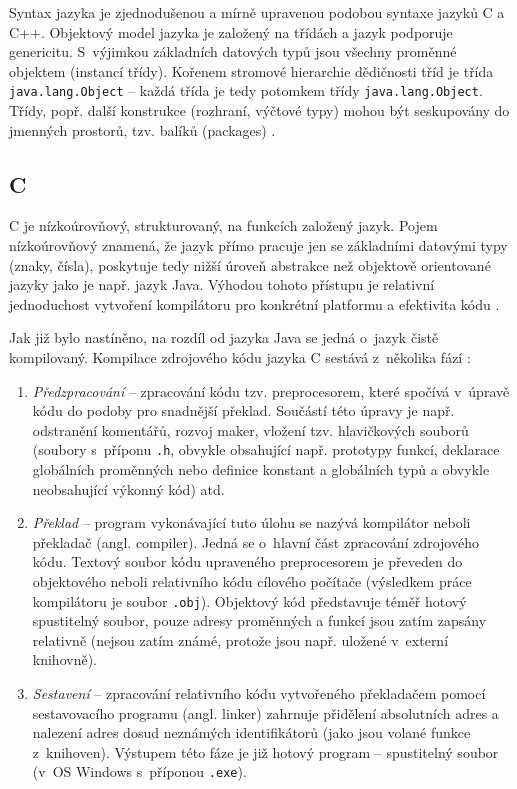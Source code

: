 \documentclass[czech,BP]{thesiskiv}
\begin{document}
Syntax jazyka je zjednodušenou a mírně upravenou podobou syntaxe jazyků C a C++. Objektový model jazyka je založený na třídách a jazyk podporuje genericitu. S~výjimkou základních datových typů jsou všechny proměnné objektem (instancí třídy). Kořenem stromové hierarchie dědičnosti tříd je třída \texttt{java.lang.Object} – každá třída je tedy potomkem třídy \texttt{java.lang.Object}. Třídy, popř. další konstrukce (rozhraní, výčtové typy) mohou být seskupovány do jmenných prostorů, tzv. balíků (packages) \cite{java-book, java-guide-object}.\par

\subsection{C}
C je nízkoúrovňový, strukturovaný, na funkcích založený jazyk. Pojem nízkoúrovňový znamená, že jazyk přímo pracuje jen se základními datovými typy (znaky, čísla), poskytuje tedy nižší úroveň abstrakce než objektově orientované jazyky jako je např. jazyk Java. Výhodou tohoto přístupu je relativní jednoduchost vytvoření kompilátoru pro konkrétní platformu a efektivita kódu \cite{c-book, c-guide}.\par
Jak již bylo nastíněno, na rozdíl od jazyka Java se jedná o~jazyk čistě kompilovaný. Kompilace zdrojového kódu jazyka C sestává z~několika fází \cite{c-book, c-guide}:
\begin{enumerate}
\item \textit{Předzpracování} -- zpracování kódu tzv. preprocesorem, které spočívá v~úpravě kódu do podoby pro snadnější překlad. Součástí této úpravy je např. odstranění komentářů, rozvoj maker, vložení tzv. hlavičkových souborů (soubory s~příponu \texttt{.h}, obvykle obsahující např. prototypy funkcí, deklarace globálních proměnných nebo definice konstant a globálních typů a obvykle neobsahující výkonný kód) atd.
\item \textit{Překlad} -- program vykonávající tuto úlohu se nazývá kompilátor neboli překladač (angl. compiler). Jedná se o~hlavní část zpracování zdrojového kódu. Textový soubor kódu upraveného preprocesorem je převeden do objektového neboli relativního kódu cílového počítače (výsledkem práce kompilátoru je soubor \texttt{.obj}). Objektový kód představuje téměř hotový spustitelný soubor, pouze adresy proměnných a funkcí jsou zatím zapsány relativně (nejsou zatím známé, protože jsou např. uložené v~externí knihovně).
\item \textit{Sestavení} -- zpracování relativního kódu vytvořeného překladačem pomocí sestavovacího programu (angl. linker) zahrnuje přidělení absolutních adres a nalezení adres dosud neznámých identifikátorů (jako jsou volané funkce z~knihoven). Výstupem této fáze je již hotový program -- spustitelný soubor (v~OS Windows s~příponou \texttt{.exe}).
\end{enumerate}\par\noindent
\end{document}
